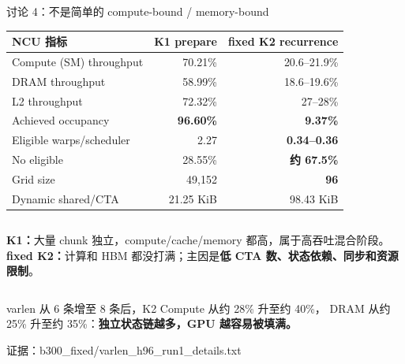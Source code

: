 \documentclass[aspectratio=169,10pt]{beamer}
\newcommand{\good}[1]{\textcolor{KdaGreen}{\textbf{#1}}}
\newcommand{\bad}[1]{\textcolor{KdaRed}{\textbf{#1}}}
\newcommand{\key}[1]{\textcolor{KdaBlue}{\textbf{#1}}}
\newcommand{\source}[1]{\vfill\hfill{\tiny\color{KdaGray}证据：#1}}
\begin{document}
\begin{frame}{讨论 4：不是简单的 compute-bound / memory-bound}
  \small
  \begin{center}
  \begin{tabular}{lrr}
    \toprule
    NCU 指标 & K1 prepare & fixed K2 recurrence \\
    \midrule
    Compute (SM) throughput & 70.21\% & 20.6--21.9\% \\
    DRAM throughput & 58.99\% & 18.6--19.6\% \\
    L2 throughput & 72.32\% & 27--28\% \\
    Achieved occupancy & \good{96.60\%} & \bad{9.37\%} \\
    Eligible warps/scheduler & 2.27 & \bad{0.34--0.36} \\
    No eligible & 28.55\% & \bad{约 67.5\%} \\
    Grid size & 49,152 & \bad{96} \\
    Dynamic shared/CTA & 21.25 KiB & 98.43 KiB \\
    \bottomrule
  \end{tabular}
  \end{center}

  \vspace{0.3em}
  \begin{columns}[T,onlytextwidth]
      \textbf{K1：}大量 chunk 独立，compute/cache/memory 都高，属于高吞吐混合阶段。
      \textbf{fixed K2：}计算和 HBM 都没打满；主因是\bad{低 CTA 数、状态依赖、同步和资源限制}。
  \end{columns}

  \vspace{0.4em}
  \centering
  varlen 从 6 条增至 8 条后，K2 Compute 从约 28\% 升至约 40\%，
  DRAM 从约 25\% 升至约 35\%：\key{独立状态链越多，GPU 越容易被填满。}

  \source{b300\_fixed/varlen\_h96\_run1\_details.txt}
\end{frame}
\end{document}
